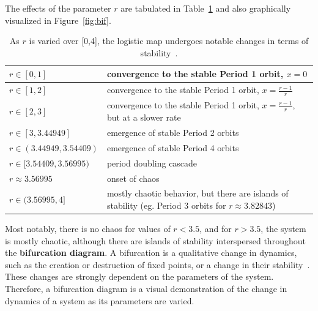 The effects of the parameter $r$ are
tabulated in Table~\ref{tbl:bif} and also graphically visualized in
Figure~\ref{fig:bif}. 
\begin {table}[!h]
\begin{center}
\caption[Behavior of the deterministic map as $r$ is varied]{As $r$ is
varied over [0,4], the logistic map undergoes notable changes in terms
of stability~\cite{may}.}\label{tbl:bif}
\begin{tabular}{ | p{4cm}| p{8cm}|}   \hline
$r \in [0,1]$ & convergence to the stable Period
1 orbit, $x=0$ \\ \hline
$r \in [1,2]$ & convergence to the stable Period 1
orbit, $x = \frac{r-1}{r}$\\ \hline
$r \in [2,3]$ & convergence to the stable Period 1
orbit, $x = \frac{r-1}{r}$, but at a slower rate\\ \hline
$r \in [3,3.44949]$ & emergence of stable Period 2 orbits\\ \hline
$r \in (3.44949, 3.54409)$ & emergence of stable Period 4 orbits\\ \hline
$r \in [3.54409,3.56995)$ & period doubling cascade\\ \hline
$ r \approx 3.56995 $ & onset of chaos\\\hline
$r \in (3.56995,4]$ & mostly chaotic behavior, but there are islands of
stability (eg. Period 3 orbits for $r \approx 3.82843$) \\\hline
\end{tabular}
\end{center}
\end {table}
Most notably, there is no chaos for values of $r
< 3.5$, and for $r > 3.5$, the system is mostly chaotic, although
there are islands of stability interspersed throughout the \textbf{bifurcation
diagram}. A bifurcation is a qualitative change in dynamics, such as
the creation or destruction of fixed points, or a change in their
stability~\cite{strogatz}. These changes are strongly dependent on the
parameters of the system. Therefore, a bifurcation diagram is a
visual demonstration of the change in dynamics of a system as its
parameters are varied. 
